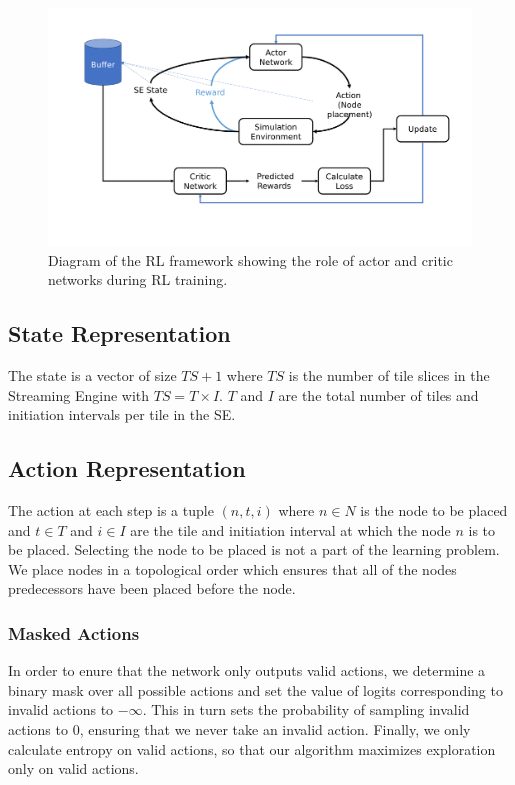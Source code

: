 \begin{figure}[h]
  \centering
  \includegraphics[width=\linewidth]{fig/ppo.pdf}
  \caption{Diagram of the RL framework showing the role of actor and critic networks during RL training. }
  \label{fig:ppo}
\end{figure}

\subsection{State Representation}
The state is a vector of size $TS+1$ where $TS$ is the number of tile slices in the Streaming Engine with $TS=T \times I$. $T$ and $I$ are the total number of tiles and initiation intervals per tile in the SE.

\subsection{Action Representation}
The action at each step is a tuple \((n,t,i)\) where $n \in N$ is the node to be placed and $t \in T$ and $i \in I$ are the tile and initiation interval at which the node $n$ is to be placed. Selecting the node to be placed is not a part of the learning problem. We place nodes in a topological order which ensures that all of the nodes predecessors have been placed before the node.

\subsubsection{Masked Actions}
In order to enure that the network only outputs valid actions, we determine a binary mask over all possible actions and set the value of logits corresponding to invalid actions to $-\infty$. 
This in turn sets the probability of sampling invalid actions to $0$, ensuring that we never take an invalid action.
Finally, we only calculate entropy on valid actions, so that our algorithm maximizes exploration only on valid actions.


